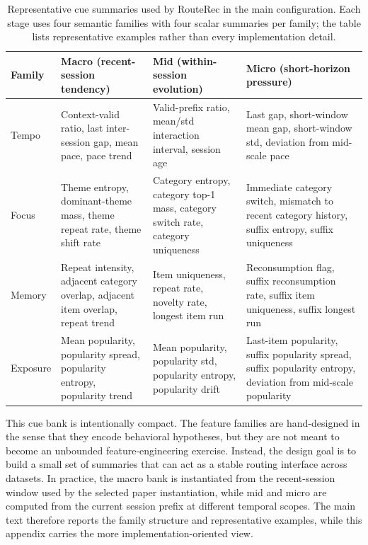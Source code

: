\documentclass[sigconf,review,anonymous]{acmart}
\begin{document}
\begin{table}[t]
  \centering
  \caption{Representative cue summaries used by RouteRec in the main configuration. Each stage uses four semantic families with four scalar summaries per family; the table lists representative examples rather than every implementation detail.}
  \label{tab:appendix-feature-families}
  \footnotesize
  \setlength{\tabcolsep}{4pt}
  \renewcommand{\arraystretch}{1.05}
  \begin{tabularx}{\textwidth}{@{}lXXX@{}}
    \toprule
    Family & Macro (recent-session tendency) & Mid (within-session evolution) & Micro (short-horizon pressure) \\
    \midrule
    Tempo & Context-valid ratio, last inter-session gap, mean pace, pace trend & Valid-prefix ratio, mean/std interaction interval, session age & Last gap, short-window mean gap, short-window std, deviation from mid-scale pace \\
    Focus & Theme entropy, dominant-theme mass, theme repeat rate, theme shift rate & Category entropy, category top-1 mass, category switch rate, category uniqueness & Immediate category switch, mismatch to recent category history, suffix entropy, suffix uniqueness \\
    Memory & Repeat intensity, adjacent category overlap, adjacent item overlap, repeat trend & Item uniqueness, repeat rate, novelty rate, longest item run & Reconsumption flag, suffix reconsumption rate, suffix item uniqueness, suffix longest run \\
    Exposure & Mean popularity, popularity spread, popularity entropy, popularity trend & Mean popularity, popularity std, popularity entropy, popularity drift & Last-item popularity, suffix popularity spread, suffix popularity entropy, deviation from mid-scale popularity \\
    \bottomrule
  \end{tabularx}
\end{table}

This cue bank is intentionally compact. The feature families are hand-designed in the sense that they encode behavioral hypotheses, but they are not meant to become an unbounded feature-engineering exercise. Instead, the design goal is to build a small set of summaries that can act as a stable routing interface across datasets. In practice, the macro bank is instantiated from the recent-session window used by the selected paper instantiation, while mid and micro are computed from the current session prefix at different temporal scopes. The main text therefore reports the family structure and representative examples, while this appendix carries the more implementation-oriented view.
\end{document}
